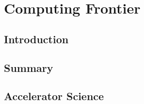  
\chapter{Computing Frontier}
\label{chap:Computing}


\begin{center}\begin{boldmath}



\end{boldmath}\end{center}


\section{Introduction}
\label{sec:comp-intro}


\section{Summary}
\label{sec:comp-summary}

\section{Accelerator Science}





